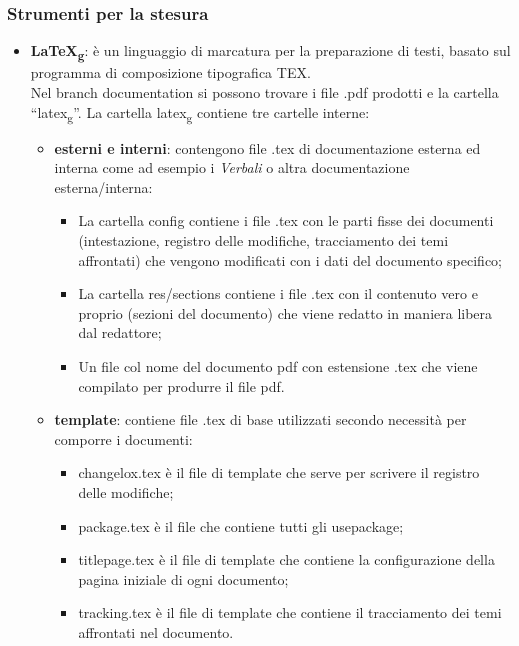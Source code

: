 \subsubsection{Strumenti per la stesura}
\begin{itemize} 
    \item \textbf{LaTeX\textsubscript{g}}: è un linguaggio di marcatura per la preparazione di testi, basato sul 				  		  programma di composizione tipografica TEX.\\
	Nel branch documentation  si possono trovare i file .pdf prodotti e la cartella “latex\textsubscript{g}”. La cartella latex\textsubscript{g} contiene tre cartelle interne:
	\begin{itemize}
	\item \textbf{esterni e interni}: contengono file .tex di documentazione esterna ed interna come ad esempio i \textit{Verbali} o altra documentazione esterna/interna:
	\begin{itemize}
		\item La cartella config contiene i file .tex con le parti fisse dei documenti (intestazione, registro delle modifiche, tracciamento dei temi affrontati) che vengono modificati con i dati del documento specifico;
		\item La cartella res/sections contiene i file .tex con il contenuto vero e proprio (sezioni del documento) che viene redatto in maniera libera dal redattore;
		\item Un file col nome del documento pdf con estensione .tex che viene compilato per produrre il file pdf.
	\end{itemize}
	 \item \textbf{template}: contiene file .tex di base utilizzati secondo necessità per comporre i documenti:
	 \begin{itemize}
	 \item changelox.tex è il file di template che serve per scrivere il registro delle modifiche;
	 \item package.tex è il file che contiene tutti gli usepackage;
	 \item titlepage.tex è il file di template che contiene la configurazione della pagina iniziale di ogni documento;  
	 \item tracking.tex è il file di template che contiene il tracciamento dei temi affrontati nel documento.
	 \end{itemize}
	\end{itemize}
\end{itemize}